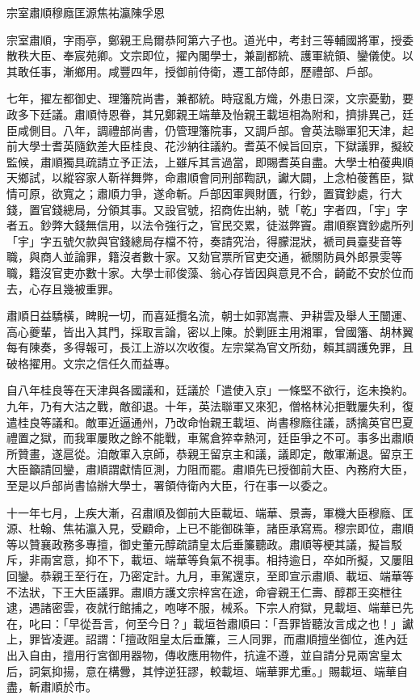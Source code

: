 
\begin{pinyinscope}
宗室肅順穆廕匡源焦祐瀛陳孚恩

宗室肅順，字雨亭，鄭親王烏爾恭阿第六子也。道光中，考封三等輔國將軍，授委散秩大臣、奉宸苑卿。文宗即位，擢內閣學士，兼副都統、護軍統領、鑾儀使。以其敢任事，漸鄉用。咸豐四年，授御前侍衛，遷工部侍郎，歷禮部、戶部。

七年，擢左都御史、理籓院尚書，兼都統。時寇亂方熾，外患日深，文宗憂勤，要政多下廷議。肅順恃恩眷，其兄鄭親王端華及怡親王載垣相為附和，擠排異己，廷臣咸側目。八年，調禮部尚書，仍管理籓院事，又調戶部。會英法聯軍犯天津，起前大學士耆英隨欽差大臣桂良、花沙納往議約。耆英不候旨回京，下獄議罪，擬絞監候，肅順獨具疏請立予正法，上雖斥其言過當，即賜耆英自盡。大學士柏葰典順天鄉試，以縱容家人靳祥舞弊，命肅順會同刑部鞫訊，讞大闢，上念柏葰舊臣，獄情可原，欲寬之；肅順力爭，遂命斬。戶部因軍興財匱，行鈔，置寶鈔處，行大錢，置官錢總局，分領其事。又設官號，招商佐出納，號「乾」字者四，「宇」字者五。鈔弊大錢無信用，以法令強行之，官民交累，徒滋弊竇。肅順察寶鈔處所列「宇」字五號欠款與官錢總局存檔不符，奏請究治，得朦混狀，褫司員臺斐音等職，與商人並論罪，籍沒者數十家。又劾官票所官吏交通，褫關防員外郎景雯等職，籍沒官吏亦數十家。大學士祁俊藻、翁心存皆因與意見不合，齮齕不安於位而去，心存且幾被重罪。

肅順日益驕橫，睥睨一切，而喜延攬名流，朝士如郭嵩燾、尹耕雲及舉人王闓運、高心夔輩，皆出入其門，採取言論，密以上陳。於剿匪主用湘軍，曾國籓、胡林翼每有陳奏，多得報可，長江上游以次收復。左宗棠為官文所劾，賴其調護免罪，且破格擢用。文宗之信任久而益專。

自八年桂良等在天津與各國議和，廷議於「遣使入京」一條堅不欲行，迄未換約。九年，乃有大沽之戰，敵卻退。十年，英法聯軍又來犯，僧格林沁拒戰屢失利，復遣桂良等議和。敵軍近逼通州，乃改命怡親王載垣、尚書穆廕往議，誘擒英官巴夏禮置之獄，而我軍屢敗之餘不能戰，車駕倉猝幸熱河，廷臣爭之不可。事多出肅順所贊畫，遂扈從。洎敵軍入京師，恭親王留京主和議，議即定，敵軍漸退。留京王大臣籲請回鑾，肅順謂獻情叵測，力阻而罷。肅順先已授御前大臣、內務府大臣，至是以戶部尚書協辦大學士，署領侍衛內大臣，行在事一以委之。

十一年七月，上疾大漸，召肅順及御前大臣載垣、端華、景壽，軍機大臣穆廕、匡源、杜翰、焦祐瀛入見，受顧命，上已不能御硃筆，諸臣承寫焉。穆宗即位，肅順等以贊襄政務多專擅，御史董元醇疏請皇太后垂簾聽政。肅順等梗其議，擬旨駁斥，非兩宮意，抑不下，載垣、端華等負氣不視事。相持逾日，卒如所擬，又屢阻回鑾。恭親王至行在，乃密定計。九月，車駕還京，至即宣示肅順、載垣、端華等不法狀，下王大臣議罪。肅順方護文宗梓宮在途，命睿親王仁壽、醇郡王奕枻往逮，遇諸密雲，夜就行館捕之，咆哮不服，械系。下宗人府獄，見載垣、端華已先在，叱曰：「早從吾言，何至今日？」載垣咎肅順曰：「吾罪皆聽汝言成之也！」讞上，罪皆凌遲。詔謂：「擅政阻皇太后垂簾，三人同罪，而肅順擅坐御位，進內廷出入自由，擅用行宮御用器物，傳收應用物件，抗違不遵，並自請分見兩宮皇太后，詞氣抑揚，意在構釁，其悖逆狂謬，較載垣、端華罪尤重。」賜載垣、端華自盡，斬肅順於市。


\end{pinyinscope}
